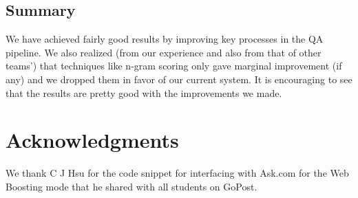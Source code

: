 \documentclass[11pt]{article}
\begin{document}
\subsection{Summary}
We have achieved fairly good results by improving key processes in the QA pipeline. We also realized (from our experience and also from that of other teams') that techniques like n-gram scoring only gave marginal improvement (if any) and we dropped them in favor of our current system. It is encouraging to see that the results are pretty good with the improvements we made.

\section*{Acknowledgments}
We thank C J Hsu for the code snippet for interfacing with Ask.com for the Web Boosting mode that he shared with all students on GoPost.

\printbibliography
\end{document}

